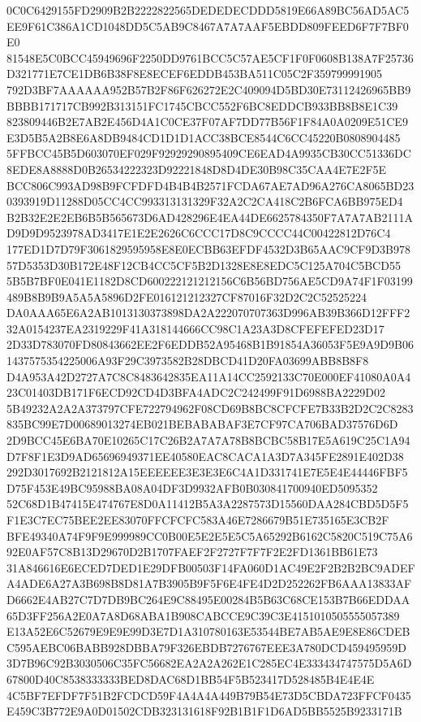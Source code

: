 \documentclass[UTF8,fontset=fandol,zihao=-4,a4paper]{ctexart}
\begin{document}
{{0C0C6429155FD2909B2B2222822565DEDEDECDDD5819E66A89BC56AD5AC5EE9F61C386A1CD1048DD5C5AB9C8467A7A7AAF5EBDD809FEED6F7F7BF0E0
81548E5C0BCC45949696F2250DD9761BCC5C57AE5CF1F0F0608B138A7F25736D321771E7CE1DB6B38F8E8ECEF6EDDB453BA511C05C2F359799991905
792D3BF7AAAAAA952B57B2F86F626272E2C409094D5BD30E73112426965BB9BBBB171717CB992B313151FC1745CBCC552F6BC8EDDCB933BB8B8E1C39
823809446B2E7AB2E456D4A1C0CE37F07AF7DD77B56F1F84A0A0209E51CE9E3D5B5A2B8E6A8DB9484CD1D1D1ACC38BCE8544C6CC45220B0808904485
5FFBCC45B5D603070EF029F92929290895409CE6EAD4A9935CB30CC51336DC8EDE8A8888D0B26534222323D92221848D8D4DE30B98C35CAA4E7E2F5E
BCC806C993AD98B9FCFDFD4B4B4B2571FCDA67AE7AD96A276CA8065BD230393919D11288D05CC4CC993313131329F32A2C2CA418C2B6FCA6BB975ED4
B2B32E2E2EB6B5B565673D6AD428296E4EA44DE6625784350F7A7A7AB2111AD9D9D9523978AD3417E1E2E2626C6CCC17D8C9CCCC44C00422812D76C4
177ED1D7D79F3061829595958E8E0ECBB63EFDF4532D3B65AAC9CF9D3B97857D5353D30B172E48F12CB4CC5CF5B2D1328E8E8EDC5C125A704C5BCD55
5B5B7BF0E041E1182D8CD600222121212156C6B56BD756AE5CD9A74F1F03199489B8B9B9A5A5A5896D2FE016121212327CF87016F32D2C2C52525224
DA0AAA65E6A2AB1013130373898DA2A222070707363D996AB39B366D12FFF232A0154237EA2319229F41A318144666CC98C1A23A3D8CFEFEFED23D17
2D33D783070FD80843662EE2F6EDDB52A95468B1B91854A36053F5E9A9D9B061437575354225006A93F29C3973582B28DBCD41D20FA03699ABB8B8F8
D4A953A42D2727A7C8C8483642835EA11A14CC2592133C70E000EF41080A0A423C01403DB171F6ECD92CD4D3BFA4ADC2C242499F91D6988BA2229D02
5B49232A2A2A373797CFE722794962F08CD69B8BC8CFCFE7B33B2D2C2C8283835BC99E7D00689013274EB021BEBABABAF3E7CF97CA706BAD37576D6D
2D9BCC45E6BA70E10265C17C26B2A7A7A78B8BCBC58B17E5A619C25C1A94D7F8F1E3D9AD65696949371EE40580EAC8CACA1A3D7A345FE2891E402D38
292D3017692B2121812A15EEEEEE3E3E3E6C4A1D331741E7E5E4E44446FBF5D75F453E49BC95988BA08A04DF3D9932AFB0B030841700940ED5095352
52C68D1B47415E474767E8D0A11412B5A3A2287573D15560DAA284CBD5D5F5F1E3C7EC75BEE2EE83070FFCFCFC583A46E7286679B51E735165E3CB2F
BFE49340A74F9F9E999989CC0B00E5E2E5E5C5A65292B6162C5820C519C75A692E0AF57C8B13D29670D2B1707FAEF2F2727F7F7F2E2FD1361BB61E73
31A846616E6ECED7DED1E29DFB00503F14FA060D1AC49E2F2B2B2BC9ADEFA4ADE6A27A3B698B8D81A7B3905B9F5F6E4FE4D2D252262FB6AAA13833AF
D6662E4AB27C7D7DB9BC264E9C88495E00284B5B63C68CE153B7B66EDDAA65D3FF256A2E0A7A8D68ABA1B908CABCCE9C39C3E4151010505555057389
E13A52E6C52679E9E9E99D3E7D1A310780163E53544BE7AB5AE9E8E86CDEBC595AEBC06BABB928DBBA79F326EBDB7276767EEE3A780DCD459495959D
3D7B96C92B3030506C35FC56682EA2A2A262E1C285EC4E333434747575D5A6D67800D40C8538333333BED8DAC68D1BB54F5B523417D528485B4E4E4E
4C5BF7EFDF7F51B2FCDCD59F4A4A4A449B79B54E73D5CBDA723FFCF0435E459C3B772E9A0D01502CDB323131618F92B1B1F1D6AD5BB5525B9233171B
}}
\end{document}
